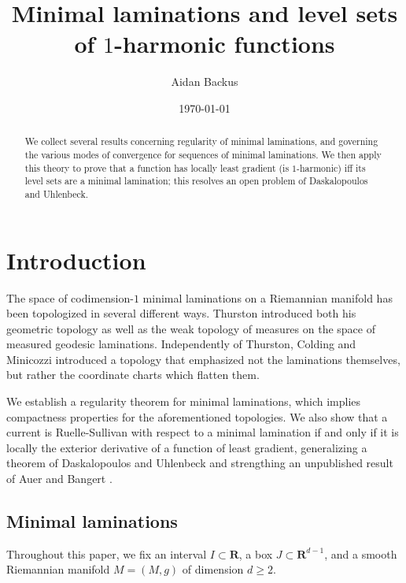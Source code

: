 \documentclass[reqno,11pt]{amsart}
\title{Minimal laminations and level sets of $1$-harmonic functions}
\author{Aidan Backus}
\date{\today}
\newcommand{\RR}{\mathbf{R}}
\theoremstyle{definition}
\numberwithin{equation}{section}
\begin{document}
\begin{abstract}
We collect several results concerning regularity of minimal laminations, and governing the various modes of convergence for sequences of minimal laminations.
We then apply this theory to prove that a function has locally least gradient (is $1$-harmonic) iff its level sets are a minimal lamination; this resolves an open problem of Daskalopoulos and Uhlenbeck.
\end{abstract}

\maketitle



\section{Introduction}
The space of codimension-$1$ minimal laminations on a Riemannian manifold has been topologized in several different ways.
Thurston \cite[Chapter 8]{thurston1979geometry} introduced both his geometric topology as well as the weak topology of measures on the space of measured geodesic laminations.
Independently of Thurston, Colding and Minicozzi \cite[Appendix B]{ColdingMinicozziIV} introduced a topology that emphasized not the laminations themselves, but rather the coordinate charts which flatten them.

We establish a regularity theorem for minimal laminations, which implies compactness properties for the aforementioned topologies.
We also show that a current is Ruelle-Sullivan with respect to a minimal lamination if and only if it is locally the exterior derivative of a function of least gradient, generalizing a theorem of Daskalopoulos and Uhlenbeck \cite[Theorem 6.1]{daskalopoulos2020transverse} and strengthing an unpublished result of Auer and Bangert \cite{Auer01, Auer12}.

\subsection{Minimal laminations}\label{Lams sections}
Throughout this paper, we fix an interval $I \subset \RR$, a box $J \subset \RR^{d - 1}$, and a smooth Riemannian manifold $M = (M, g)$ of dimension $d \geq 2$.
\end{document}
